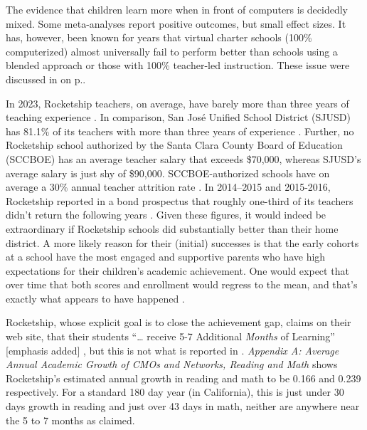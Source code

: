 The evidence that children learn more when in front of computers is decidedly mixed. Some meta-analyses report positive outcomes, but small effect sizes. It has, however, been known for years that virtual charter schools (100\% computerized) almost universally fail to perform better than schools using a blended approach or those with 100\% teacher-led instruction. These issue were discussed in  on p.\pageref{sec:types-instruction}.


In 2023, Rocketship teachers, on average, have barely more than three years of teaching experience \parencite{SCCOE14-23}. In comparison, San José Unified School District (SJUSD) has 81.1\% of its teachers with more than three years of experience \parencite{USNews2023}. Further, no Rocketship school authorized by the Santa Clara County Board of Education (SCCBOE) has an average teacher salary that exceeds \$70,000, whereas SJUSD's average salary is just shy of \$90,000. SCCBOE-authorized schools have on average a 30\% annual teacher attrition rate \parencite{SCCOE14-23}. In 2014–2015 and 2015-2016, Rocketship reported in a bond prospectus that roughly one-third of its teachers didn't return the following years \parencite{CSFA2017}. Given these figures, it would indeed be extraordinary if Rocketship schools did substantially better than their home district. A more likely reason for their (initial) successes is that the early cohorts at a school have the most engaged and supportive parents who have high expectations for their children's academic achievement. One would expect that over time that both scores and enrollment would regress to the mean, and that's exactly what appears to have happened \parencite{SCCOE14-23}. 

Rocketship, whose explicit goal is to close the achievement gap, claims on their web site, that their students ``\ldots{} receive 5-7 Additional \textit{Months} of Learning'' [emphasis added] \parencite{RSED2023}, but this is not what is reported in \textcite{Raymond.etal2023}. \textit{Appendix A: Average Annual Academic Growth of CMOs and Networks, Reading and Math} \textcite[132]{Raymond.etal2023} shows Rocketship's estimated annual growth in reading and math to be 0.166 and 0.239 respectively. For a standard 180 day year (in California), this is just under 30 days growth in reading and just over 43 days in math, neither are anywhere near the 5 to 7 months as claimed.

